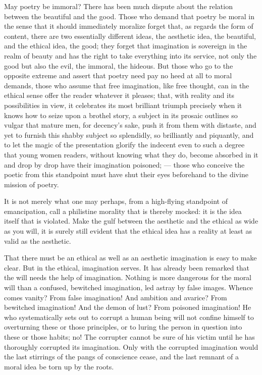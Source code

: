 \documentclass[12pt,a4paper,openany]{book}
\newcommand{\opage}[1]{\marginnote{\footnotesize\textit{[#1]}}}
\begin{document}
May poetry be immoral? There has been much dispute about the relation between the beautiful and the good. Those who demand that poetry be moral in the sense that it should immediately moralize forget that, as regards the form of content, there are two essentially different ideas, the aesthetic idea, the beautiful, and the ethical idea, the good; they forget that imagination is sovereign in the realm of beauty and has the right to take everything into its service, not only the good but also the evil, the immoral, the hideous. But those who go to the opposite extreme and assert that poetry need pay no heed at all to moral demands, those who assume that free imagination, like free thought, can in the ethical sense offer the reader whatever it pleases; that, with reality and its possibilities in view, it celebrates its most brilliant triumph precisely when it knows how to seize upon a brothel story,
\setcounter{footnote}{0}%
\opage{86}a subject in its prosaic outlines so vulgar that mature men, for decency's sake, push it from them with distaste, and yet to furnish this shabby subject so splendidly, so brilliantly and piquantly, and to let the magic of the presentation glorify the indecent even to such a degree that young women readers, without knowing what they do, become absorbed in it and drop by drop have their imagination poisoned; --- those who conceive the poetic from this standpoint must have shut their eyes beforehand to the divine mission of poetry.

It is not merely what one may perhaps, from a high-flying standpoint of emancipation, call a philistine morality that is thereby mocked: it is the idea itself that is violated. Make the gulf between the aesthetic and the ethical as wide as you will, it is surely still evident that the ethical idea has a reality at least as valid as the aesthetic.

That there must be an ethical as well as an aesthetic imagination is easy to make clear. But in the ethical, imagination serves. It has already been remarked that the will needs the help of imagination. Nothing is more dangerous for the moral will than a confused, bewitched imagination, led astray by false images. Whence comes vanity? From false imagination! And ambition and avarice? From bewitched imagination! And the demon of lust? From poisoned imagination! He who systematically sets out to corrupt a human being will not confine himself to overturning these or those principles, or to luring the person in question into these or those habits; no! The corrupter cannot be sure of his victim until he has thoroughly corrupted its imagination. Only with the
\setcounter{footnote}{0}%
\opage{87}corrupted imagination would the last stirrings of the pangs of conscience cease, and the last remnant of a moral idea be torn up by the roots.
\end{document}
